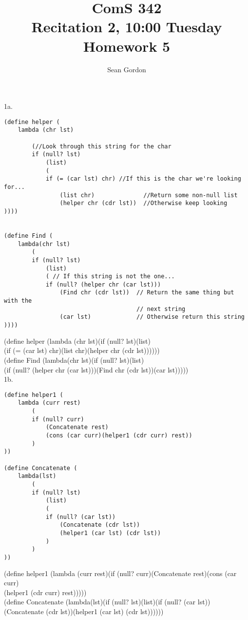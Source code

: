\documentclass[12pt]{article}
\title{ComS 342\\Recitation 2, 10:00 Tuesday\\Homework 5}
\author{Sean Gordon}
\begin{document}
\maketitle


\noindent 1a.
\begin{lstlisting}
(define helper (
    lambda (chr lst)
    
        (//Look through this string for the char
        if (null? lst)
            (list)
            (
            if (= (car lst) chr) //If this is the char we're looking for...
                (list chr)              //Return some non-null list
                (helper chr (cdr lst))  //Otherwise keep looking
))))


(define Find (
    lambda(chr lst)
        (
        if (null? lst)
            (list)
            ( // If this string is not the one...
            if (null? (helper chr (car lst))) 
                (Find chr (cdr lst))  // Return the same thing but with the
                                      // next string
                (car lst)             // Otherwise return this string
))))

\end{lstlisting}
(define helper (lambda (chr lst)(if (null? lst)(list)\\
\indent (if (= (car lst) chr)(list chr)(helper chr (cdr lst))))))\\
(define Find (lambda(chr lst)(if (null? lst)(list)\\
\indent (if (null? (helper chr (car lst)))(Find chr (cdr lst))(car lst)))))\\




\noindent 1b.
\begin{lstlisting}
(define helper1 (
    lambda (curr rest)
        (
	    if (null? curr)
            (Concatenate rest)
            (cons (car curr)(helper1 (cdr curr) rest))
        )
))

(define Concatenate (
    lambda(lst)
        (
        if (null? lst)
            (list)
            (
            if (null? (car lst))
                (Concatenate (cdr lst))
                (helper1 (car lst) (cdr lst))
            )
        )
))

\end{lstlisting}
(define helper1 (lambda (curr rest)(if (null? curr)(Concatenate rest)(cons (car curr)\\
\indent (helper1 (cdr curr) rest)))))\\
(define Concatenate (lambda(lst)(if (null? lst)(list)(if (null? (car lst))\\
\indent (Concatenate (cdr lst))(helper1 (car lst) (cdr lst))))))
\pagebreak
\end{document}
